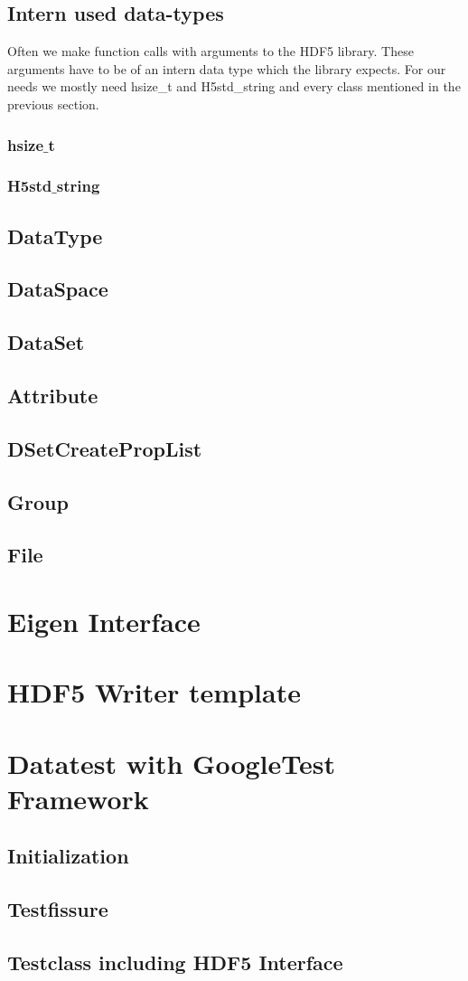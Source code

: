 \documentclass{article}
\begin{document}
\subsection{Intern used data-types}
Often we make function calls with arguments to the HDF5 library. These arguments have to be of an intern data type which the library expects. For our needs we mostly need hsize\_t and H5std\_string and every class mentioned in the previous section.
\subsubsection{hsize$\_$t}

\subsubsection{H5std$\_$string}

\subsection{DataType}
\subsection{DataSpace}
\subsection{DataSet}
\subsection{Attribute}
\subsection{DSetCreatePropList}
\subsection{Group}
\subsection{File}

\section{Eigen Interface}

\section{HDF5 Writer template}

\section{Datatest with GoogleTest Framework}
\subsection{Initialization}
\subsection{Testfissure}
\subsection{Testclass including HDF5 Interface}






\end{document}
